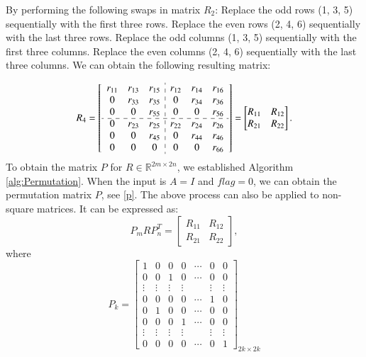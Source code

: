 \documentclass[5p,10pt]{elsarticle}
\numberwithin{equation}{section}
\begin{document}
By performing the following swaps in matrix $R_2$: Replace the odd rows (1, 3, 5) sequentially with the first three rows. Replace the even rows (2, 4, 6) sequentially with the last three rows. Replace the odd columns (1, 3, 5) sequentially with the first three columns. Replace the even columns (2, 4, 6) sequentially with the last three columns. We can obtain the following  resulting matrix:

\[R_4 = \begin{bmatrix}
\begin{array}{ccc:ccc}
 r_{11} & r_{13} & r_{15} & r_{12} & r_{14} & r_{16}\\
 0      & r_{33} & r_{35} & 0      & r_{34} & r_{36}\\
 0      & 0      & r_{55} & 0      & 0      & r_{56}\\
 \cdashline{1-6}
0 & r_{23} & r_{25} & r_{22} & r_{24} & r_{26}\\
 0      & 0 & r_{45} & 0      & r_{44} & r_{46}\\
 0      & 0      & 0 & 0      & 0      & r_{66}\\
\end{array}
\end{bmatrix}=\begin{bmatrix}
    R_{11} & R_{12}\\R_{21} & R_{22}
\end{bmatrix}.
\]
To obtain the matrix $P$ for $R \in \mathbb{R}^{2m \times 2n}$, we established Algorithm \ref{alg:Permutation}. When the input is $A=I$ and $flag=0$, we can obtain the permutation matrix $P$, see \eqref{p}. The above process can also be applied to non-square matrices. It can be expressed as:
\begin{equation}
    P_{m} R P_{n}^T = \begin{bmatrix} R_{11} & R_{12}\\R_{21}& R_{22}\end{bmatrix},\label{eq:Rn}
\end{equation}
where
\begin{equation}\label{p}
    P_k = \begin{bmatrix} 
            1 & 0 & 0 & 0 & \cdots & 0 & 0\\ 
            0 & 0 & 1 & 0 & \cdots & 0 & 0\\ 
            \vdots & \vdots & \vdots & \vdots &  & \vdots & \vdots\\ 
            0 & 0 & 0 & 0 & \cdots & 1 & 0 \\
            0 & 1 & 0 & 0 & \cdots & 0 & 0\\ 
            0 & 0 & 0 & 1 & \cdots & 0 & 0\\ 
            \vdots & \vdots & \vdots & \vdots &  & \vdots & \vdots\\ 
            0 & 0 & 0 & 0 &\cdots & 0 & 1 
        \end{bmatrix}_{2k \times 2k}
\end{equation}
\end{document}
